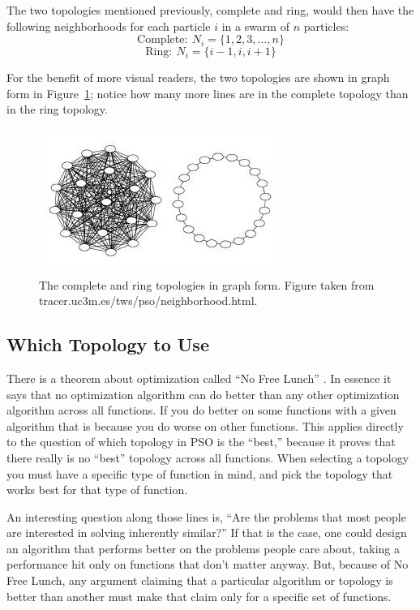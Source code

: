 \documentclass[onecolumn, 12pt]{article}
\begin{document}
The two topologies mentioned previously, complete and ring, would then have the
following neighborhoods for each particle $i$ in a swarm of $n$ particles:
\[\mathrm{Complete:}\ N_i = \{1,2,3,\dots,n\}\]
\[\mathrm{Ring:}\ N_i = \{i-1,i,i+1\}\]

For the benefit of more visual readers, the two topologies are shown in graph
form in Figure~\ref{fig:topgraphs}; notice how many more lines are in the 
complete topology than in the ring topology.

\begin{figure}
  \centering
  \includegraphics{gbest_and_lbest.eps}
  \caption{The complete and ring topologies in graph form.  Figure taken from
  tracer.uc3m.es/tws/pso/neighborhood.html.}
  \label{fig:topgraphs}
\end{figure}

\subsection{Which Topology to Use}

There is a theorem about optimization called ``No Free Lunch''
\cite{wolpert-tec97}. In essence it says that no optimization algorithm can do
better than any other optimization algorithm across all functions.  If you do
better on some functions with a given algorithm that is because you do worse on
other functions.  This applies directly to the question of which topology in
PSO is the ``best,'' because it proves that there really is no ``best''
topology across all functions.  When selecting a topology you must have a
specific type of function in mind, and pick the topology that works best for
that type of function.

An interesting question along those lines is, ``Are the problems that most
people are interested in solving inherently similar?''  If that is the case,
one could design an algorithm that performs better on the problems people care
about, taking a performance hit only on functions that don't matter anyway.
But, because of No Free Lunch, any argument claiming that a particular
algorithm or topology is better than another must make that claim only for a
specific set of functions.
\end{document}
